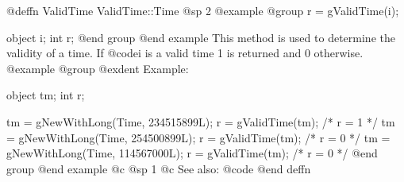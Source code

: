@deffn {ValidTime} ValidTime::Time
@sp 2
@example
@group
r = gValidTime(i);

object  i;
int     r;
@end group
@end example
This method is used to determine the validity of a time.  If @code{i}
is a valid time 1 is returned and 0 otherwise.
@example
@group
@exdent Example:

object  tm;
int     r;

tm = gNewWithLong(Time, 234515899L);
r = gValidTime(tm);   /*  r = 1  */
tm = gNewWithLong(Time, 254500899L);
r = gValidTime(tm);   /*  r = 0  */
tm = gNewWithLong(Time, 114567000L);
r = gValidTime(tm);   /*  r = 0  */
@end group
@end example
@c @sp 1
@c See also:  @code{}
@end deffn













